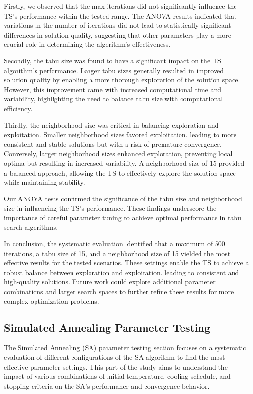 \documentclass{article}
\begin{document}
    Firstly, we observed that the max iterations did not significantly influence the TS’s performance within the tested range. The ANOVA results indicated that variations in the number of iterations did not lead to statistically significant differences in solution quality, suggesting that other parameters play a more crucial role in determining the algorithm's effectiveness.

    Secondly, the tabu size was found to have a significant impact on the TS algorithm's performance. Larger tabu sizes generally resulted in improved solution quality by enabling a more thorough exploration of the solution space. However, this improvement came with increased computational time and variability, highlighting the need to balance tabu size with computational efficiency.

    Thirdly, the neighborhood size was critical in balancing exploration and exploitation. Smaller neighborhood sizes favored exploitation, leading to more consistent and stable solutions but with a risk of premature convergence. Conversely, larger neighborhood sizes enhanced exploration, preventing local optima but resulting in increased variability. A neighborhood size of 15 provided a balanced approach, allowing the TS to effectively explore the solution space while maintaining stability.

    Our ANOVA tests confirmed the significance of the tabu size and neighborhood size in influencing the TS’s performance. These findings underscore the importance of careful parameter tuning to achieve optimal performance in tabu search algorithms.

    In conclusion, the systematic evaluation identified that a maximum of 500 iterations, a tabu size of 15, and a neighborhood size of 15 yielded the most effective results for the tested scenarios. These settings enable the TS to achieve a robust balance between exploration and exploitation, leading to consistent and high-quality solutions. Future work could explore additional parameter combinations and larger search spaces to further refine these results for more complex optimization problems.

    \newpage

    \subsection{Simulated Annealing Parameter Testing}

    The Simulated Annealing (SA) parameter testing section focuses on a systematic evaluation of different configurations of the SA algorithm to find the most effective parameter settings.
    This part of the study aims to understand the impact of various combinations of initial temperature, cooling schedule, and stopping criteria on the SA’s performance and convergence behavior.
\end{document}
